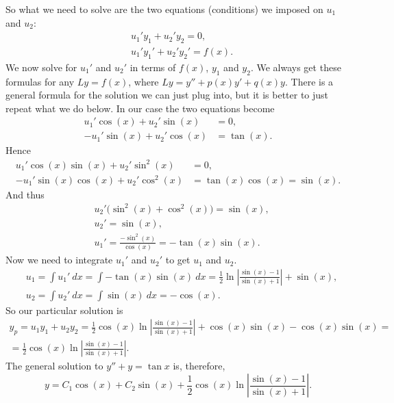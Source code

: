 So what we need to solve are the two equations (conditions) we imposed
on $u_1$ and $u_2$:
\begin{equation*}
\boxed{~~
\begin{aligned}
& u_1' y_1 + u_2' y_2 = 0 ,\\
& u_1' y_1' + u_2' y_2' = f(x) .
\end{aligned}
~~}
\end{equation*}
We now solve for $u_1'$ and $u_2'$ in terms of $f(x)$, $y_1$ and $y_2$.
We always get these formulas for any $Ly = f(x)$, where $Ly =
y''+p(x)y'+q(x)y$.  There is a general
formula for the solution we can just plug into, but it is better to
just repeat what we do below.  In our case the two equations become
\begin{align*}
u_1' \cos (x) + u_2' \sin (x) &= 0 ,\\
-u_1' \sin (x) + u_2' \cos (x) &= \tan (x) .
\end{align*}
Hence
\begin{align*}
u_1' \cos (x) \sin (x) + u_2' \sin^2 (x) & = 0 ,\\
-u_1' \sin (x) \cos (x) + u_2' \cos^2 (x) & = \tan (x) \cos (x) = \sin (x) .
\end{align*}
And thus
\begin{align*}
& u_2' \bigl(\sin^2 (x) + \cos^2 (x)\bigr) = \sin (x) , \\
& u_2' = \sin (x) , \\
& u_1' = \frac{- \sin^2 (x)}{\cos (x)} = - \tan (x) \sin (x) .
\end{align*}
Now we need to integrate $u_1'$ and $u_2'$ to get $u_1$ and $u_2$.
\begin{align*}
& u_1 = \int u_1'~dx 
= \int - \tan (x) \sin (x)~dx
= \frac{1}{2}
\ln \left\lvert \frac{\sin (x)-1}{\sin (x) + 1} \right\rvert
+ \sin (x) , \\
& u_2 = \int u_2'~dx 
= \int \sin (x)~dx = -\cos (x) .
\end{align*}
So our particular solution is
\begin{multline*}
y_p = u_1 y_1 + u_2 y_2 =
\frac{1}{2} \cos (x) \ln \left\lvert \frac{\sin (x)-1}{\sin (x) + 1}
\right\rvert
+ \cos (x) \sin (x)
-\cos (x) \sin (x)
= \\ =
\frac{1}{2} \cos (x) \ln \left\lvert \frac{\sin (x)-1}{\sin (x) + 1}
\right\rvert .
\end{multline*}
The general solution to $y'' + y = \tan x$ is, therefore,
\begin{equation*}
y = C_1 \cos (x) + C_2 \sin (x) +
\frac{1}{2} \cos (x) \ln \left\lvert \frac{\sin (x)-1}{\sin (x) + 1}
\right\rvert .
\end{equation*}


